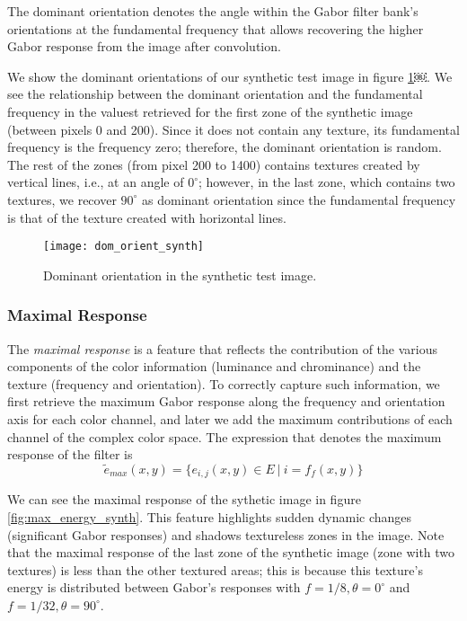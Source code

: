 The dominant orientation denotes the angle within the Gabor filter bank's orientations at the fundamental frequency that allows recovering the higher Gabor response from the image after convolution.

We show the dominant orientations of our synthetic test image in figure \ref{fig:dom_orient_synth}￼. We see the relationship between the dominant orientation and the fundamental frequency in the valuest retrieved for the first zone of the synthetic image (between pixels 0 and 200). Since it does not contain any texture, its fundamental frequency is the frequency zero; therefore, the dominant orientation is random. The rest of the zones (from pixel 200 to 1400) contains textures created by vertical lines, i.e., at an angle of $0^\circ$; however, in the last zone, which contains two textures, we recover $90^\circ$ as dominant orientation since the fundamental frequency is that of the texture created with horizontal lines. 

\begin{figure}[!ht]
	\texttt{[image: dom\_orient\_synth]}
    \caption{Dominant orientation in the synthetic test image.}
    \label{fig:dom_orient_synth}
\end{figure}

\subsubsection{Maximal Response}
The \textit{maximal response} is a feature that reflects the contribution of the various components of the color information (luminance and chrominance) and the texture (frequency and orientation). To correctly capture such information, we first retrieve the maximum Gabor response along the frequency and orientation axis for each color channel, and later we add the maximum contributions of each channel of the complex color space. The expression that denotes the maximum response of the filter is
\begin{equation}
	\widetilde{e}_{max}(x,y) = \lbrace e_{i,j}(x,y) \in E ~|~ i = f_{f}(x,y) \rbrace \label{eq:max_energy}
\end{equation}

We can see the maximal response of the sythetic image in figure \ref{fig:max_energy_synth}. This feature highlights sudden dynamic changes (significant Gabor responses) and shadows textureless zones in the image. Note that the maximal response of the last zone of the synthetic image (zone with two textures) is less than the other textured areas; this is because this texture's energy is distributed between Gabor's responses with $f=1/8, \theta=0^\circ$ and $f=1/32, \theta=90^\circ$.

